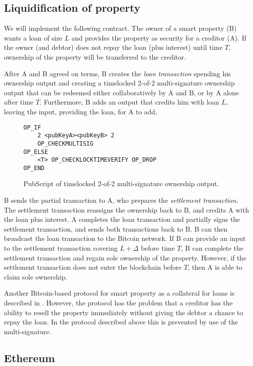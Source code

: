 \subsection{Liquidification of property}

We will implement the following contract. The owner of a smart property (B) wants a loan of size $L$ and provides the property as security for a creditor (A). If the owner (and debtor) does not repay the loan (plus interest) until time $T$, ownership of the property will be transferred to the creditor.

After A and B agreed on terms, B creates the \emph{loan transaction} spending his ownership output and creating a timelocked 2-of-2 multi-signature ownership output that can be redeemed either collaboratively by A and B, or by A alone after time $T$. Furthermore, B adds an output that credits him with loan $L$, leaving the input, providing the loan, for A to add. 
\begin{figure}
\begin{lstlisting}
OP_IF 
    2 <pubKeyA><pubKeyB> 2
    OP_CHECKMULTISIG
OP_ELSE
    <T> OP_CHECKLOCKTIMEVERIFY OP_DROP
OP_END    
\end{lstlisting}
\caption{PubScript of timelocked 2-of-2 multi-signature ownership output.}
\end{figure}

B sends the partial transaction to A, who prepares the \emph{settlement transaction}. The settlement transaction reassigns the ownership back to B, and credits A with the loan plus interest. A completes the loan transaction and partially signs the settlement transaction, and sends both transactions back to B. B can then broadcast the loan transaction to the Bitcoin network. 
If B can provide an input to the settlement transaction covering $L+\Delta$ before time $T$, B can complete the settlement transaction and regain sole ownership of the property. However, if the settlement transaction does not enter the blockchain before $T$, then A is able to claim sole ownership.

Another Bitcoin-based protocol for smart property as a collateral for loans is described in \cite{smartproperty2011}. However, the protocol has the problem that a creditor has the ability to resell the property immediately without giving the debtor a chance to repay the loan. In the protocol described above this is prevented by use of the multi-signature. 

\subsection{Ethereum}

